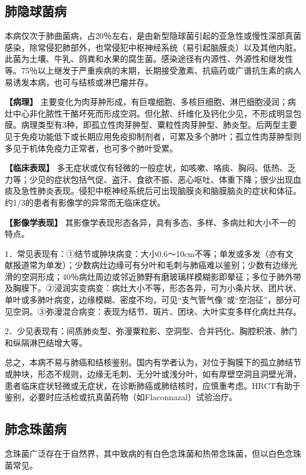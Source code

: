 \subsection{肺隐球菌病}

本病仅次于肺曲菌病，占20％左右，是由新型隐球菌引起的亚急性或慢性深部真菌感染，除常侵犯肺部外，也常侵犯中枢神经系统（易引起脑膜炎）以及其他内脏。此菌为土壤、牛乳、鸽粪和水果的腐生菌。感染途径有内源性、外源性和继发性等。75％以上继发于严重疾病的末期，长期接受激素、抗癌药或广谱抗生素的病人易诱发本病，也可与结核或淋巴瘤并存。

\textbf{【病理】}
主要变化为肉芽肿形成，有巨噬细胞、多核巨细胞、淋巴细胞浸润；病灶中心非化脓性干酪坏死而形成空洞。但化脓、纤维化及钙化少见，不形成明显包膜。病理类型有3种，即孤立性肉芽肿型、粟粒性肉芽肿型、肺炎型。后两型主要见于免疫功能低下或长期应用免疫抑制剂者，可累及多个肺叶；孤立性肉芽肿型则多见于机体免疫力正常者，也可多个肺叶受累。

\textbf{【临床表现】}
多无症状或仅有轻微的一般症状，如咳嗽、咯痰、胸闷、低热、乏力等；少见的症状包括气促、盗汗、食欲不振、恶心呕吐、体重下降；很少出现血痰及急性肺炎表现。侵犯中枢神经系统后可出现脑膜炎和脑膜脑炎的症状和体征。约1/3的患者有影像学的异常而无临床症状。

\textbf{【影像学表现】}
其影像学表现形态各异，具有多态、多样、多病灶和大小不一的特点。

1．常见表现有：①结节或肿块病变：大小0.6～10cm不等；单发或多发（亦有文献报道常为单发）；少数病灶边缘可有分叶和毛刺与肺癌难以鉴别；少数有边缘光滑的空洞形成；40％病灶周边或邻近肺野有磨玻璃样模糊影即晕征；多位于肺外带及胸膜下。②浸润实变病变：病灶大小不等，形态各异，可为小条片状、团片状、单叶或多肺叶病变，边缘模糊、密度不均，可见“支气管气像”或“空泡征”，部分可见空洞。③弥漫混合病变：表现为结节、斑片、团块、大叶实变多样化病灶共存。

2．少见表现有：间质肺炎型、弥漫粟粒影、空洞型、合并钙化、胸腔积液、肺门和纵隔淋巴结增大等。

总之，本病不易与肺癌和结核鉴别。国内有学者认为，对位于胸膜下的孤立肺结节或肿块，形态不规则，边缘无毛刺、无分叶或浅分叶，如有厚壁空洞且洞壁光滑，患者临床症状轻微或无症状，在诊断肺癌或肺结核时，应慎重考虑。HRCT有助于鉴别，必要时应活检或抗真菌药物（如Flaconnazal）试验治疗。

\subsection{肺念珠菌病}

念珠菌广泛存在于自然界，其中致病的有白色念珠菌和热带念珠菌，但以白色念珠菌常见。

